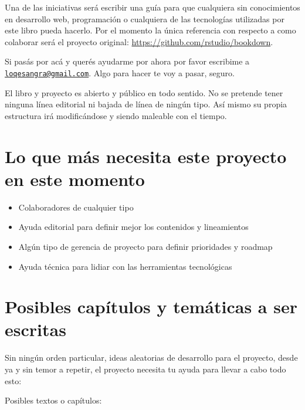 \documentclass[
]{book}
\providecommand{\tightlist}{%
  \setlength{\itemsep}{0pt}\setlength{\parskip}{0pt}}
\begin{document}
Una de las iniciativas será escribir una guía para que cualquiera sin conocimientos en desarrollo web, programación o cualquiera de las tecnologías utilizadas por este libro pueda hacerlo. Por el momento la única referencia con respecto a como colaborar será el proyecto original: \url{https://github.com/rstudio/bookdown}.

Si pasás por acá y querés ayudarme por ahora por favor escribime a \href{mailto:loqesangra@gmail.com}{\nolinkurl{loqesangra@gmail.com}}. Algo para hacer te voy a pasar, seguro.

El libro y proyecto es abierto y público en todo sentido. No se pretende tener ninguna línea editorial ni bajada de línea de ningún tipo. Así mismo su propia estructura irá modificándose y siendo maleable con el tiempo.

\hypertarget{lo-que-muxe1s-necesita-este-proyecto-en-este-momento}{%
\section{Lo que más necesita este proyecto en este momento}\label{lo-que-muxe1s-necesita-este-proyecto-en-este-momento}}

\begin{itemize}
\tightlist
\item
  Colaboradores de cualquier tipo
\item
  Ayuda editorial para definir mejor los contenidos y lineamientos
\item
  Algún tipo de gerencia de proyecto para definir prioridades y roadmap
\item
  Ayuda técnica para lidiar con las herramientas tecnológicas
\end{itemize}

\hypertarget{posibles-capuxedtulos-y-temuxe1ticas-a-ser-escritas}{%
\section{Posibles capítulos y temáticas a ser escritas}\label{posibles-capuxedtulos-y-temuxe1ticas-a-ser-escritas}}

Sin ningún orden particular, ideas aleatorias de desarrollo para el proyecto, desde ya y sin temor a repetir, el proyecto necesita tu ayuda para llevar a cabo todo esto:

Posibles textos o capítulos:
\end{document}
